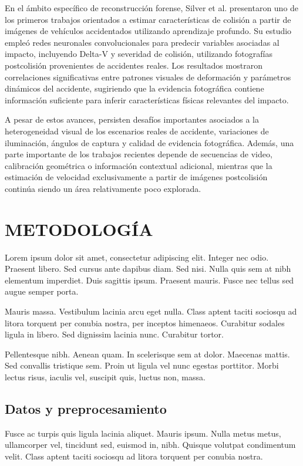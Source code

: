 \documentclass[esp]{cesvi-class}
\begin{document}
En el ámbito específico de reconstrucción forense, Silver et al. \cite{Silver2022CrashCharacteristics} presentaron uno de los primeros trabajos orientados a estimar características de colisión a partir de imágenes de vehículos accidentados utilizando aprendizaje profundo. Su estudio empleó redes neuronales convolucionales para predecir variables asociadas al impacto, incluyendo Delta-V y severidad de colisión, utilizando fotografías postcolisión provenientes de accidentes reales. Los resultados mostraron correlaciones significativas entre patrones visuales de deformación y parámetros dinámicos del accidente, sugiriendo que la evidencia fotográfica contiene información suficiente para inferir características físicas relevantes del impacto.

A pesar de estos avances, persisten desafíos importantes asociados a la heterogeneidad visual de los escenarios reales de accidente, variaciones de iluminación, ángulos de captura y calidad de evidencia fotográfica. Además, una parte importante de los trabajos recientes depende de secuencias de video, calibración geométrica o información contextual adicional, mientras que la estimación de velocidad exclusivamente a partir de imágenes postcolisión continúa siendo un área relativamente poco explorada.

\section{METODOLOGÍA}
Lorem ipsum dolor sit amet, consectetur adipiscing elit. Integer nec odio. Praesent libero. Sed cursus ante dapibus diam. Sed nisi. Nulla quis sem at nibh elementum imperdiet. Duis sagittis ipsum. Praesent mauris. Fusce nec tellus sed augue semper porta.

Mauris massa. Vestibulum lacinia arcu eget nulla. Class aptent taciti sociosqu ad litora torquent per conubia nostra, per inceptos himenaeos. Curabitur sodales ligula in libero. Sed dignissim lacinia nunc. Curabitur tortor.

Pellentesque nibh. Aenean quam. In scelerisque sem at dolor. Maecenas mattis. Sed convallis tristique sem. Proin ut ligula vel nunc egestas porttitor. Morbi lectus risus, iaculis vel, suscipit quis, luctus non, massa.

\subsection{Datos y preprocesamiento}
Fusce ac turpis quis ligula lacinia aliquet. Mauris ipsum. Nulla metus metus, ullamcorper vel, tincidunt sed, euismod in, nibh. Quisque volutpat condimentum velit. Class aptent taciti sociosqu ad litora torquent per conubia nostra.
\end{document}
